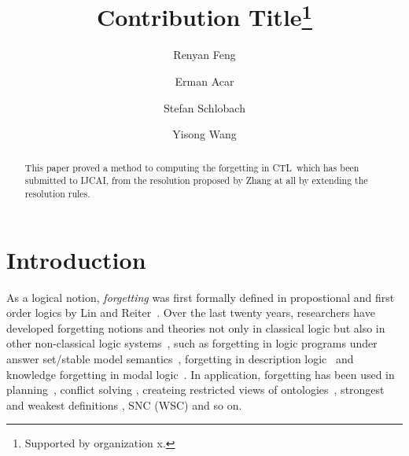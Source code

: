 \documentclass[runningheads]{llncs}
\newcommand{\CTL}{\textrm{CTL}}
\begin{document}
%
\title{Contribution Title\thanks{Supported by organization x.}}
%
%
\author{Renyan Feng \and
Erman Acar \and
Stefan Schlobach \and
Yisong Wang}
%
%
%


\maketitle              %
%
\begin{abstract}
This paper proved a method to computing the forgetting in \CTL\, which has been submitted to IJCAI, from the resolution proposed by Zhang at all by extending the resolution rules.

\end{abstract}

\section{Introduction}
As a logical notion, \emph{forgetting} was first formally defined
in propostional and first order logics by Lin and Reiter~\cite{lin1994forget}.
Over the last twenty years, researchers have developed forgetting notions and theories not only in classical logic but also in other non-classical logic systems~\cite{eiter2019brief}, such as forgetting in logic programs under answer set/stable model semantics~\cite{DBLP:Zhang:AIJ2006,Eiter2008Semantic,Wong:PhD:Thesis,Yisong:KR:2012,Yisong:IJCAI:2013}, forgetting in description logic~\cite{Wang:AMAI:2010,Lutz:IJCAI:2011,zhao2017role} and knowledge forgetting in modal logic~\cite{Yan:AIJ:2009,Kaile:JAIR:2009,Yongmei:IJCAI:2011,fang2019forgetting}. In application, forgetting has been used in planning~\cite{lin2003compiling},  conflict solving \cite{Lang2010Reasoning,Zhang2005Solving},
createing restricted views of ontologies~\cite{zhao2017role},
strongest and weakest definitions \cite{Lang2008On}, SNC (WSC) \cite{DBLP:journals/ai/Lin01} and so on.
\end{document}
